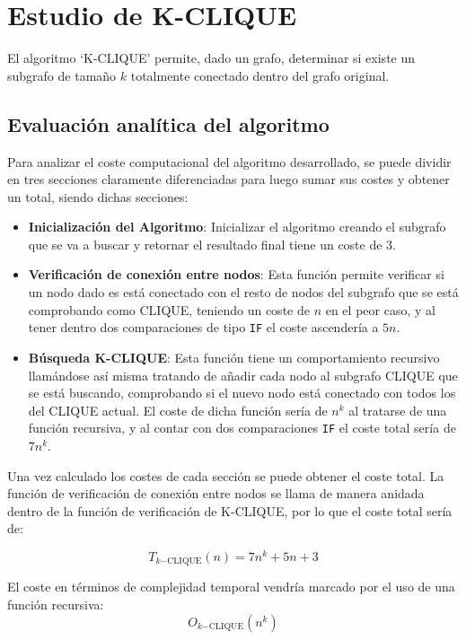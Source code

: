 \section{Estudio de K-CLIQUE}\label{sec:clique}
El algoritmo `K-CLIQUE' permite, dado un grafo, determinar si existe un subgrafo de tamaño $k$ totalmente conectado dentro del grafo original.


\subsection*{Evaluación analítica del algoritmo}
Para analizar el coste computacional del algoritmo desarrollado, se puede dividir en tres secciones claramente diferenciadas para luego sumar sus costes y obtener un total, siendo dichas secciones: 

\begin{itemize}
    \item \textbf{Inicialización del Algoritmo}: Inicializar el algoritmo creando el subgrafo que se va a buscar y retornar el resultado final tiene un coste de 3.
    \item \textbf{Verificación de conexión entre nodos}: Esta función permite verificar si un nodo dado es está conectado con el resto de nodos del subgrafo que se está comprobando como CLIQUE, teniendo un coste de $n$ en el peor caso, y al tener dentro dos comparaciones de tipo \texttt{IF} el coste ascendería a $5n$.
    \item \textbf{Búsqueda K-CLIQUE}: Esta función tiene un comportamiento recursivo llamándose así misma tratando de añadir cada nodo al subgrafo CLIQUE que se está buscando, comprobando si el nuevo nodo está conectado con todos los del CLIQUE actual.
    El coste de dicha función sería de $n^k$ al tratarse de una función recursiva, y al contar con dos comparaciones \texttt{IF} el coste total sería de $7n^k$.
\end{itemize}

Una vez calculado los costes de cada sección se puede obtener el coste total. La función de verificación de conexión entre nodos se llama de  manera anidada dentro de la función de verificación de K-CLIQUE, por lo que el coste total sería de:

\begin{equation}
    T_{k\mathrm{-CLIQUE}}(n) = 7n^k + 5n +3
\end{equation}

El coste en términos de complejidad temporal vendría marcado por el uso de una función recursiva: 
\begin{equation}
    O_{k\mathrm{-CLIQUE}}(n^k) 
\end{equation}



